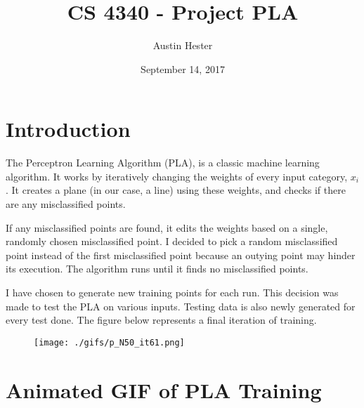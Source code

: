 \documentclass{article}
\begin{document}
\title{CS 4340 - Project PLA}
\author{Austin Hester}
\date{September 14, 2017}
\maketitle

\makeatletter
\def\@seccntformat#1{%
	 \expandafter\ifx\csname c@#1\endcsname\c@section\else
	  \csname the#1\endcsname\quad
  \fi}
\makeatother



\section*{Introduction}

The Perceptron Learning Algorithm (PLA), is a classic machine learning algorithm. It works by iteratively changing the weights 
of every input category, $x_i$. It creates a plane (in our case, a line) using these weights, and checks if there are any 
misclassified points.

If any misclassified points are found, it edits the weights based on a single, randomly chosen misclassified point. I decided to pick 
a random misclassified point instead of the first misclassified point because an outying point may hinder its execution. The algorithm runs until it 
finds no misclassified points.

I have chosen to generate new training points for each run. This decision was made to test the PLA on various inputs. Testing data is also newly 
generated for every test done. The figure below represents a final iteration of training.

\begin{figure}[h]
	\centering
	\texttt{[image: ./gifs/p\_N50\_it61.png]}
\end{figure}


\newpage
\section*{Animated GIF of PLA Training}
\begin{center}
\hspace{-6em} 
\end{center}
\end{document}
